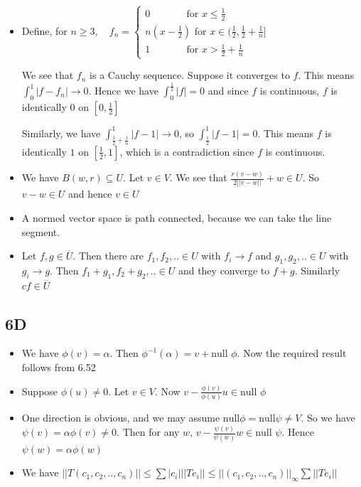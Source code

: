 \documentclass{article}
\begin{document}
\begin{itemize}
    \item[9] Define, for $n\geq3,\quad f_n=\begin{cases}
        0 \quad \quad \quad \ \ \ \text{for }x \leq\frac{1}{2} \\
        n(x-\frac{1}{2}) \text{ for } x\in (\frac{1}{2},\frac{1}{2}+\frac{1}{n}] \\
        1 \quad \quad \quad \ \ \ \text{for }x>\frac{1}{2}+\frac{1}{n}
    \end{cases}$ 

    We see that $f_n$ is a Cauchy sequence. Suppose it converges to $f$. This means $\int_0^1|f-f_n| \to 0$. Hence we have $\int_0^\frac{1}{2}|f|=0$ and since $f$ is continuous, $f$ is identically $0$ on $[0,\frac{1}{2}]$

    Similarly, we have $\int_{\frac{1}{2}+\frac{1}{n}}^1|f-1| \to 0$, so $\int_\frac{1}{2}^1|f-1|=0$. This means $f$ is identically $1$ on $[\frac{1}{2},1]$, which is a contradiction since $f$ is continuous.


    \item[10] We have $B(w,r)\subseteq U$. Let $v \in V$. We see that $\frac{r(v-w)}{2||v-w||}+w \in U$. So $v-w\in U$ and hence $v \in U$ 
    
    \item[11] A normed vector space is path connected, because we can take the line segment. 

    \item[12] Let $f,g \in \overline{U}$. Then there are $f_1,f_2,.. \in U$ with $f_i\to f$ and $g_1,g_2,.. \in U$ with $g_i \to g$. Then $f_1+g_1,f_2+g_2,.. \in U$ and they converge to $f+g$. Similarly $cf \in \overline{U}$ 
\end{itemize}

\subsection*{6D}
\begin{itemize}
    \item [1] We have $\phi(v)=\alpha$. Then $\phi^{-1}(\alpha)=v+\text{null }\phi$. Now the required result follows from 6.52
    \item[2] Suppose $\phi(u)\neq 0$. Let $v \in V$. Now $v-\frac{\phi(v)}{\phi(u)}u \in \text{null }\phi$
    \item[3] One direction is obvious, and we may assume $\text{null} \phi =\text{null}\psi \neq V$. So we have $\psi(v)=\alpha \phi(v) \neq 0$. Then for any $w$, $v-\frac{\psi(v)}{\psi(w)}w \in \text{null }\psi$. Hence $\psi(w)=\alpha \phi(w)$
    \item[4] We have $||T(c_1,c_2,..,c_n)||\leq \sum|c_i|||Te_i||\leq ||(c_1,c_2,..,c_n)||_\infty\sum ||Te_i||$
\end{itemize}
\end{document}
